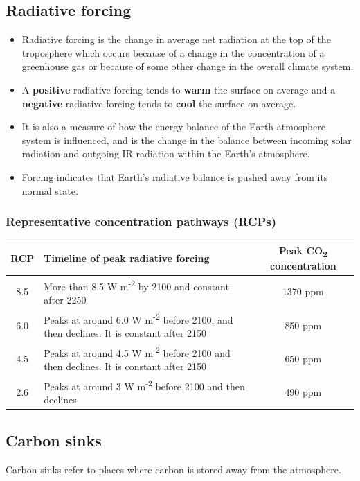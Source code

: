 \documentclass[11pt]{article}
\begin{document}
\subsection{Radiative forcing}
\label{sec:org3e7d647}
\begin{itemize}
\item Radiative forcing is the change in average net radiation at the top of the troposphere which occurs because of a change in the concentration of a greenhouse gas or because of some other change in the overall climate system.
\item A \textbf{positive} radiative forcing tends to \textbf{warm} the surface on average and a \textbf{negative} radiative forcing tends to \textbf{cool} the surface on average.
\item It is also a measure of how the energy balance of the Earth-atmosphere system is influenced, and is the change in the balance between incoming solar radiation and outgoing IR radiation within the Earth's atmosphere.
\item Forcing indicates that Earth's radiative balance is pushed away from its normal state.
\end{itemize}

\subsubsection{Representative concentration pathways (RCPs)}
\label{sec:orgce819be}
\begin{center}
\begin{tabular}{|c|m{17em}|c|}
\hline
\textbf{RCP} & \textbf{Timeline of peak radiative forcing} & \textbf{Peak CO\textsubscript{2} concentration}\\[0pt]
\hline
8.5 & More than 8.5 W m\textsuperscript{-2} by 2100 and constant after 2250 & 1370 ppm\\[0pt]
\hline
6.0 & Peaks at around 6.0 W m\textsuperscript{-2} before 2100, and then declines. It is constant after 2150 & 850 ppm\\[0pt]
\hline
4.5 & Peaks at around 4.5 W m\textsuperscript{-2} before 2100 and then declines. It is constant after 2150 & 650 ppm\\[0pt]
\hline
2.6 & Peaks at around 3 W m\textsuperscript{-2} before 2100 and then declines & 490 ppm\\[0pt]
\hline
\end{tabular}
\end{center}

\subsection{Carbon sinks}
\label{sec:org6c62add}
Carbon sinks refer to places where carbon is stored away from the atmosphere.
\end{document}
